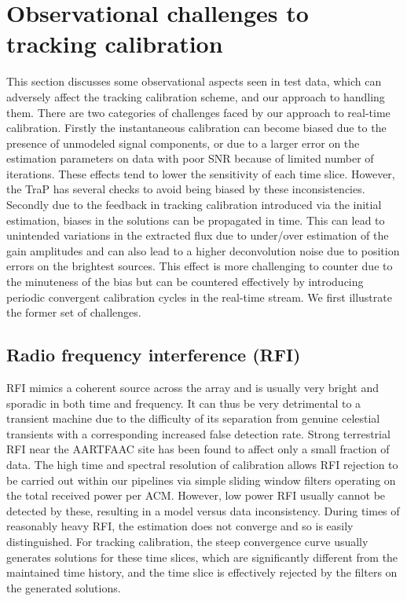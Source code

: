 \documentclass[referee]{aa}
\begin{document}
\section{\label{sec:Challenges-to-tracking}Observational challenges to tracking calibration}
This section  discusses some observational aspects  seen in test  data, which can
adversely affect the  tracking calibration scheme, and our  approach to handling
them.  There are two categories of challenges faced by our approach to real-time
calibration. Firstly the instantaneous calibration can become biased due to the
presence of  unmodeled signal components,  or due to  a larger error  on the
estimation  parameters on  data  with poor  SNR  because of  limited number  of
iterations.   These effects  tend to  lower the  sensitivity of  each time slice.
However,  the  TraP   has  several  checks  to  avoid   being  biased  by  these
inconsistencies.   Secondly  due  to   the  feedback  in  tracking  calibration
introduced via the initial estimation, biases in the solutions can be propagated
in time.   This can lead to unintended  variations in the extracted  flux due to
under/over estimation  of the  gain amplitudes  and can also  lead to  a higher
deconvolution noise due to position errors on the brightest sources. This effect
is more  challenging to counter due  to the minuteness  of the bias but  can be
countered effectively  by introducing periodic convergent  calibration cycles in
the real-time stream. We first illustrate the former set of challenges.

\subsection{Radio frequency interference (RFI)}

RFI mimics  a coherent source  across the array  and is usually very  bright and
sporadic in both time  and frequency.   It can  thus be  very detrimental  to a
transient machine due to the difficulty of its separation from genuine celestial
transients  with  a  corresponding   increased  false  detection  rate.   Strong
terrestrial RFI  near the \mbox{AARTFAAC} site  has been found to  affect only a
small fraction  of data.  The high  time and spectral  resolution of calibration
allows RFI rejection  to be carried out within our  pipelines via simple sliding
window  filters operating on  the total  received power  per ACM.   However, low
power RFI usually cannot be detected  by these, resulting in a model versus data
inconsistency.  During  times of reasonably  heavy RFI, the estimation  does not
converge and  so is easily  distinguished.  For tracking calibration,  the steep
convergence curve usually  generates solutions for these time  slices, which are
significantly different from  the maintained time history, and  the time slice is
effectively rejected by the filters on the generated solutions.
\end{document}
